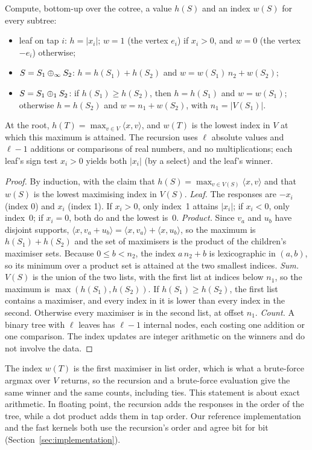 \begin{proposition}
\label{prop:recursion}
Compute, bottom-up over the cotree, a value $h(S)$ and an index $w(S)$ for every subtree:
\begin{itemize}
\item leaf on tap $i$: $h=|x_i|$; $w=1$ (the vertex $e_i$) if $x_i>0$, and $w=0$ (the
  vertex $-e_i$) otherwise;
\item $S=S_1\oplus_\infty S_2$: $h=h(S_1)+h(S_2)$ and $w=w(S_1)\,n_2+w(S_2)$;
\item $S=S_1\oplus_1 S_2$: if $h(S_1)\ge h(S_2)$, then $h=h(S_1)$ and $w=w(S_1)$; otherwise
  $h=h(S_2)$ and $w=n_1+w(S_2)$, with $n_1=|V(S_1)|$.
\end{itemize}
At the root, $h(T)=\max_{v\in V}\langle x,v\rangle$, and $w(T)$ is the lowest index in $V$
at which this maximum is attained. The recursion uses $\ell$ absolute values and $\ell-1$
additions or comparisons of real numbers, and no multiplications; each leaf's sign test
$x_i>0$ yields both $|x_i|$ (by a select) and the leaf's winner.
\end{proposition}

\begin{proof}
By induction, with the claim that $h(S)=\max_{v\in V(S)}\langle x,v\rangle$ and that $w(S)$
is the lowest maximising index in $V(S)$.
\emph{Leaf.} The responses are $-x_i$ (index 0) and $x_i$ (index 1). If $x_i>0$, only
index~1 attains $|x_i|$; if $x_i<0$, only index~0; if $x_i=0$, both do and the lowest is~0.
\emph{Product.} Since $v_a$ and $u_b$ have disjoint supports,
$\langle x,v_a+u_b\rangle=\langle x,v_a\rangle+\langle x,u_b\rangle$, so the maximum is
$h(S_1)+h(S_2)$ and the set of maximisers is the product of the children's maximiser sets.
Because $0\le b<n_2$, the index $a\,n_2+b$ is lexicographic in $(a,b)$, so its minimum
over a product set is attained at the two smallest indices.
\emph{Sum.} $V(S)$ is the union of the two lists, with the first list at indices below
$n_1$, so the maximum is $\max(h(S_1),h(S_2))$. If $h(S_1)\ge h(S_2)$, the first list
contains a maximiser, and every index in it is lower than every index in the second.
Otherwise every maximiser is in the second list, at offset $n_1$.
\emph{Count.} A binary tree with $\ell$ leaves has $\ell-1$ internal nodes, each costing one
addition or one comparison. The index updates are integer arithmetic on the winners and do
not involve the data.
\end{proof}

The index $w(T)$ is the first maximiser in list order, which is what a brute-force argmax
over $V$ returns, so the recursion and a brute-force evaluation give the same winner and
the same counts, including ties. This
statement is about exact arithmetic. In floating point, the recursion adds the responses in
the order of the tree, while a dot product adds them in tap order. Our reference
implementation and the fast kernels both use the recursion's order and agree bit for bit
(Section~\ref{sec:implementation}).


